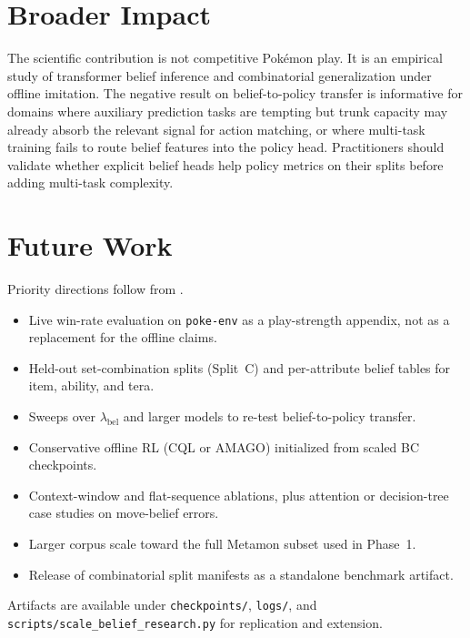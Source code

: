 \section{Broader Impact}

The scientific contribution is not competitive Pok\'emon play. It is an empirical
study of transformer belief inference and combinatorial generalization under
offline imitation. The negative result on belief-to-policy transfer is informative
for domains where auxiliary prediction tasks are tempting but trunk capacity may
already absorb the relevant signal for action matching, or where multi-task
training fails to route belief features into the policy head. Practitioners
should validate whether explicit belief heads help policy metrics on their splits
before adding multi-task complexity.

\section{Future Work}

Priority directions follow from .
\begin{itemize}
  \item Live win-rate evaluation on \texttt{poke-env} as a play-strength appendix,
    not as a replacement for the offline claims.
  \item Held-out set-combination splits (Split~C) and per-attribute belief tables
    for item, ability, and tera.
  \item Sweeps over $\lambda_\mathrm{bel}$ and larger models to re-test
    belief-to-policy transfer.
  \item Conservative offline RL (CQL or AMAGO) initialized from scaled BC
    checkpoints.
  \item Context-window and flat-sequence ablations, plus attention or
    decision-tree case studies on move-belief errors.
  \item Larger corpus scale toward the full Metamon subset used in Phase~1.
  \item Release of combinatorial split manifests as a standalone benchmark artifact.
\end{itemize}

Artifacts are available under \texttt{checkpoints/}, \texttt{logs/}, and
\texttt{scripts/scale\_belief\_research.py} for replication and extension.
